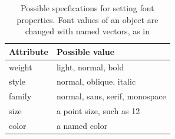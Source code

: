 \begin{table}
\centering
\label{tab:gWidgets-font-properties}
\caption{Possible specfications for setting font properties. Font values of an object are changed with named vectors, as in }
\begin{tabular}{@{}lp{}@{}}
\toprule

Attribute&Possible value\\
\midrule
weight&light, normal, bold\\style&normal, oblique, italic\\family&normal, sans, serif, monospace\\size&a point size, such as 12\\color&a named color
\\ \bottomrule
\end{tabular}
\end{table}
